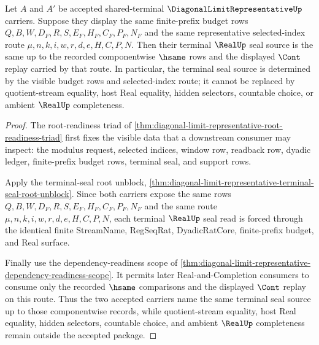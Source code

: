 \begin{theorem}
\label{thm:diagonal-limit-representative-budget-source-determinacy}
Let $A$ and $A'$ be accepted shared-terminal $\DiagonalLimitRepresentativeUp$ carriers. Suppose they display the same finite-prefix budget rows $Q,B,W,D_F,R,S,E_F,H_F,C_F,P_F,N_F$ and the same representative selected-index route $\mu,n,k,i,w,r,d,e,H,C,P,N$. Then their terminal $\RealUp$ seal source is the same up to the recorded componentwise $\hsame$ rows and the displayed $\Cont$ replay carried by that route. In particular, the terminal seal source is determined by the visible budget rows and selected-index route; it cannot be replaced by quotient-stream equality, host Real equality, hidden selectors, countable choice, or ambient $\RealUp$ completeness.
\end{theorem}
\begin{proof}
The root-readiness triad of \autoref{thm:diagonal-limit-representative-root-readiness-triad} first fixes the visible data that a downstream consumer may inspect: the modulus request, selected indices, window row, readback row, dyadic ledger, finite-prefix budget rows, terminal seal, and support rows.

Apply the terminal-seal root unblock, \autoref{thm:diagonal-limit-representative-terminal-seal-root-unblock}. Since both carriers expose the same rows $Q,B,W,D_F,R,S,E_F,H_F,C_F,P_F,N_F$ and the same route $\mu,n,k,i,w,r,d,e,H,C,P,N$, each terminal $\RealUp$ seal read is forced through the identical finite StreamName, RegSeqRat, DyadicRatCore, finite-prefix budget, and Real surface.

Finally use the dependency-readiness scope of \autoref{thm:diagonal-limit-representative-dependency-readiness-scope}. It permits later Real-and-Completion consumers to consume only the recorded $\hsame$ comparisons and the displayed $\Cont$ replay on this route. Thus the two accepted carriers name the same terminal seal source up to those componentwise records, while quotient-stream equality, host Real equality, hidden selectors, countable choice, and ambient $\RealUp$ completeness remain outside the accepted package.
\end{proof}

